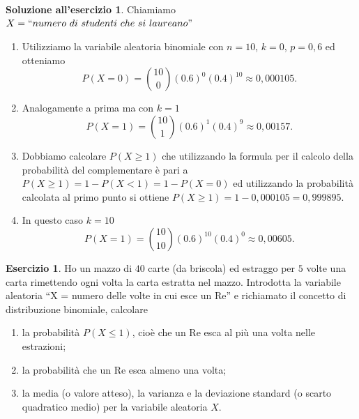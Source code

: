 \documentclass[12pt,a4paper]{article}
\theoremstyle{definition}
\newtheorem{sol}{Soluzione all'esercizio}
\newtheorem{exe}{Esercizio}
\begin{document}
\begin{sol} Chiamiamo $ X = ``numero\ di\  studenti \ che\ si\ laureano" $
	\begin{enumerate}
		\item Utilizziamo la variabile aleatoria binomiale con $ n=10 $, $ k=0 $, $ p = 0,6 $ ed otteniamo
		      \[ P(X=0) = \binom{10}{0}\left( 0.6\right)^{0}\left( 0.4\right)^{10} \approx 0,000105. \]
		\item  Analogamente a prima ma con $ k=1 $
		      \[ P(X=1) = \binom{10}{1}\left( 0.6\right)^{1}\left( 0.4\right)^{9} \approx 0,00157. \]
		\item Dobbiamo calcolare $ P(X\ge 1) $ che utilizzando la formula per il calcolo della probabilità del complementare è pari a $ P(X\ge 1) = 1 - P(X < 1) = 1 - P(X=0) $ ed utilizzando la probabilità calcolata al primo punto si ottiene $  P(X\ge 1) = 1 - 0,000105= 0,999895.$
		\item In questo caso $ k=10 $
		      \[ P(X=1) = \binom{10}{10}\left( 0.6\right)^{10}\left( 0.4\right)^{0} \approx 0,00605. \]
	\end{enumerate}
\end{sol}

\begin{exe}
	Ho un mazzo di $ 40 $ carte (da briscola) ed estraggo per $ 5 $ volte una carta rimettendo ogni
	volta la carta estratta nel mazzo. Introdotta la variabile aleatoria “X = numero delle volte in cui esce un Re” e richiamato il concetto di distribuzione binomiale, calcolare
	\begin{enumerate}
		\item la probabilità $ P({X \le 1}) $, cioè che un Re esca al più una volta nelle estrazioni;
		\item la probabilità che un Re esca almeno una volta;
		\item la media (o valore atteso), la varianza e la deviazione standard (o scarto quadratico medio) per la variabile aleatoria $ X $.
	\end{enumerate}
\end{exe}
\end{document}
